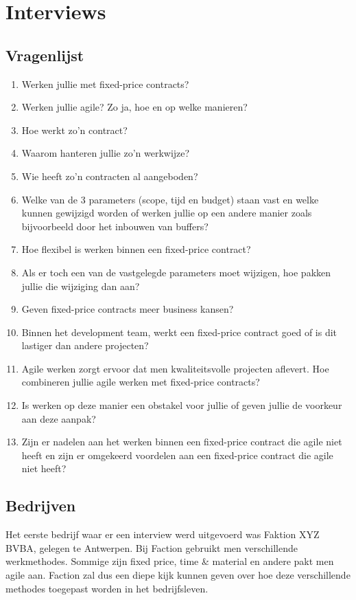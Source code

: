 \documentclass{hogent-article}
\begin{document}
	\section{Interviews}
	\subsection{Vragenlijst}
	\label{vragen}
	\begin{enumerate}
		\item Werken jullie met fixed-price contracts?
		\item Werken jullie agile? Zo ja, hoe en op welke manieren?
		\item Hoe werkt zo'n contract?
		\item Waarom hanteren jullie zo’n werkwijze?
		\item Wie heeft zo'n contracten al aangeboden?
		\item Welke van de 3 parameters (scope, tijd en budget) staan vast en welke kunnen gewijzigd worden of werken jullie op een andere manier zoals bijvoorbeeld door het inbouwen van buffers?
		\item Hoe flexibel is werken binnen een fixed-price contract?
		\item Als er toch een van de vastgelegde parameters moet wijzigen, hoe pakken jullie die wijziging dan aan?
		\item Geven fixed-price contracts meer business kansen?
		\item Binnen het development team, werkt een fixed-price contract goed of is dit lastiger dan andere projecten?
		\item Agile werken zorgt ervoor dat men kwaliteitsvolle projecten aflevert. Hoe combineren jullie agile werken met fixed-price contracts?
		\item Is werken op deze manier een obstakel voor jullie of geven jullie de voorkeur aan deze aanpak?
		\item Zijn er nadelen aan het werken binnen een fixed-price contract die agile niet heeft en zijn er omgekeerd voordelen aan een fixed-price contract die agile niet heeft?
	\end{enumerate}
		
    \subsection{Bedrijven}
    Het eerste bedrijf waar er een interview werd uitgevoerd was Faktion XYZ BVBA, gelegen te Antwerpen. Bij Faction gebruikt men verschillende werkmethodes. Sommige zijn fixed price, time \& material en andere pakt men agile aan. Faction zal dus een diepe kijk kunnen geven over hoe deze verschillende methodes toegepast worden in het bedrijfsleven.
    
\end{document}
